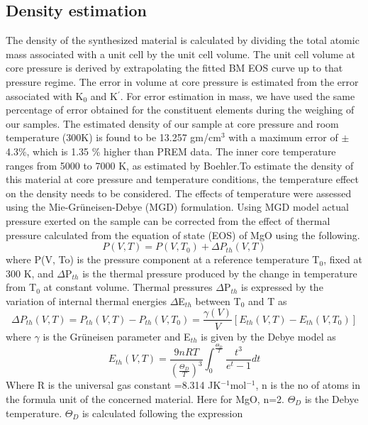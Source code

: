 \documentclass[prb,aps,preprint]{revtex4-2}
\begin{document}
\subsection{Density estimation}
The density of the synthesized material is calculated by dividing the total atomic mass associated with a unit cell by the unit cell volume. The unit cell volume at core pressure is derived by extrapolating the fitted BM EOS curve up to that pressure regime. The error in volume at core pressure is estimated from the error associated with K$_{0}$ and K$^{'}$. For error estimation in mass, we have used the same percentage of error obtained for the constituent elements during the weighing of our samples.
The estimated density of our sample at core pressure and room temperature (300K) is found to be 13.257 gm/cm$^{3}$ with a maximum error of  $\pm$4.3\%, which is 1.35 \% higher than PREM data. The inner core temperature ranges from 5000 to 7000 K, as estimated by Boehler\cite{boehler1996melting}.To estimate the density of this material at core pressure and temperature conditions, the temperature effect on the density needs to be considered. The effects of temperature were assessed using the Mie-Grüneisen-Debye (MGD) formulation\cite{gruneisen1959state}. Using MGD model actual pressure exerted on the sample can be corrected from the effect of thermal pressure calculated from the equation of state (EOS) of MgO using the following.
\begin{equation}
	P(V,T)=P(V,T_{0})+\Delta P_{th}(V,T)
\end{equation}
where P(V, To) is the pressure component at a reference temperature T$_{0}$, fixed at 300 K, and $\Delta$P$_{th}$ is the thermal pressure produced by the change in temperature from T$_{0}$ at constant volume. 
Thermal pressures  $\Delta$P$_{th}$ is expressed by the variation of internal thermal energies $\Delta$E$_{th}$  between T$_{0}$ and T as\cite{tange2009unified} \begin{equation} \Delta P_{th}(V,T)=P_{th}(V,T)-P_{th}(V,T_{0})=\frac{\gamma (V)}{V}\left [ E_{th}(V,T)-E_{th}(V,T_{0}) \right ]
\end{equation}
where $\gamma$ is the Grüneisen parameter and E$_{th}$ is given by the Debye model as 
\begin{equation}
	E_{th}(V,T)=\frac{9nRT}{\left ( \frac{\Theta_{D} }{T} \right )^{3}}\int_{0}^{\frac{\Theta_{D} }{T}}\frac{t^{3}}{e^{t}-1}dt
\end{equation}
Where R is the universal gas constant =8.314 JK$^{-1}$mol$^{-1}$, n is the no of atoms in the formula unit of the concerned material. Here for MgO, n=2. $\Theta_{D}$ is the Debye temperature. $\Theta_{D}$ is calculated following the expression
\end{document}
